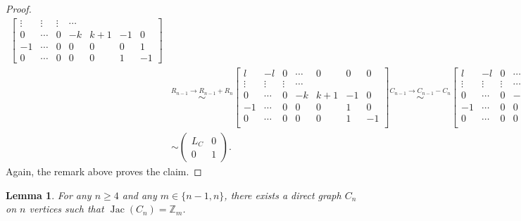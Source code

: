 \documentclass[11pt,reqno]{amsart}
\DeclareMathOperator{\Jac}{Jac}
\newcommand{\Z}{\mathbb{Z}}
\theoremstyle{definition}
\theoremstyle{plain}
\newtheorem{lem}[mydef]{\textbf{Lemma}}
\begin{document}
\begin{proof}
\begin{align}
\begin{bmatrix}
				\vdots & \vdots & \vdots & \cdots \\
				0 & \cdots & 0 & -k & k+1 & -1 & 0  \\
				-1 & \cdots & 0 & 0 & 0 & 0 & 1 \\
				0 & \cdots & 0 & 0 & 0 & 1 & -1 
			\end{bmatrix} \\ 
			&\stackrel{R_{n-1} \to R_{n-1} + R_{n}}\sim 
			\begin{bmatrix} 
				l  & -l & 0 & \cdots & 0 & 0 & 0 \\
				\vdots & \vdots & \vdots & \cdots \\
				0 & \cdots & 0 & -k & k+1 & -1 & 0  \\
				-1 & \cdots & 0 & 0 & 0 & 1 & 0 \\ 
				0 & \cdots & 0 & 0 & 0 & 1 & -1 \\ 
			\end{bmatrix}
			\stackrel{C_{n-1} \to C_{n-1} - C_{n}}\sim 
			\begin{bmatrix} 
				l  & -l & 0 & \cdots & 0 & 0 & 0 \\
				\vdots & \vdots & \vdots & \cdots \\
				0 & \cdots & 0 & -k & k+1 & -1 & 0  \\
				-1 & \cdots & 0 & 0 & 0 & 1 & 0 \\ 
				0 & \cdots & 0 & 0 & 0 & 0 & -1 \\ 
			\end{bmatrix} \\
			&\sim 
			\left( \begin{array}{c|c}
				L_C & 0 \\
				\hline
				0 & 1
			\end{array} \right).
			\end{align}
			Again, the remark above proves the claim.
		\end{proof}

		\begin{lem}
			For any $n \ge 4$ and any $m \in \{ n-1, n \}$, there exists a direct graph $C_n$ on $n$ vertices such that $\Jac (C_n) = \Z_m$. 
		\end{lem}
\end{document}
